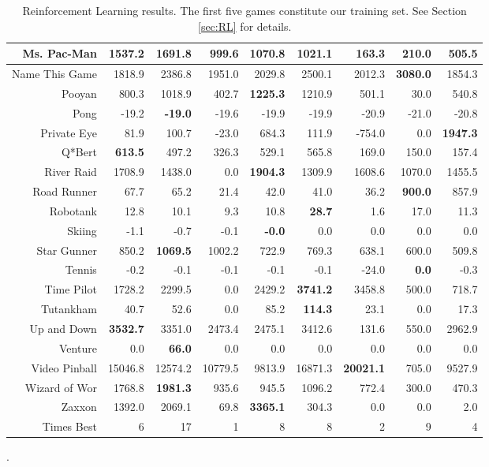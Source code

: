 \documentclass[twoside,11pt]{article}
\newcommand{\gamename}[1]{{\sc #1}}
\begin{document}
\begin{table}[h!]
\begin{center}
\begin{tabular}{|r|r|r|r|r|r||r|r|r|}
\hline
\gamename{Ms. Pac-Man} & 1537.2& \textbf { 1691.8 }& 999.6& 1070.8& 1021.1& 163.3& 210.0& 505.5\\
\hline
\gamename{Name This Game} & 1818.9& 2386.8& 1951.0& 2029.8& 2500.1& 2012.3& \textbf { 3080.0 }& 1854.3\\
\hline
\gamename{Pooyan} & 800.3& 1018.9& 402.7& \textbf { 1225.3 }& 1210.9& 501.1& 30.0& 540.8\\
\hline
\gamename{Pong} & -19.2& \textbf { -19.0 }& -19.6& -19.9& -19.9& -20.9& -21.0& -20.8\\
\hline
\gamename{Private Eye} & 81.9& 100.7& -23.0& 684.3& 111.9& -754.0& 0.0& \textbf { 1947.3 }\\
\hline
\gamename{Q*Bert} & \textbf { 613.5 }& 497.2& 326.3& 529.1& 565.8& 169.0& 150.0& 157.4\\
\hline
\gamename{River Raid} & 1708.9& 1438.0& 0.0& \textbf { 1904.3 }& 1309.9& 1608.6& 1070.0& 1455.5\\
\hline
\gamename{Road Runner} & 67.7& 65.2& 21.4& 42.0& 41.0& 36.2& \textbf { 900.0 }& 857.9\\
\hline
\gamename{Robotank} & 12.8& 10.1& 9.3& 10.8& \textbf { 28.7 }& 1.6& 17.0& 11.3\\
\hline
\gamename{Skiing} & -1.1& -0.7& -0.1& \textbf { -0.0 }& 0.0& 0.0& 0.0& 0.0\\
\hline
\gamename{Star Gunner} & 850.2& \textbf { 1069.5 }& 1002.2& 722.9& 769.3& 638.1& 600.0& 509.8\\
\hline
\gamename{Tennis} & -0.2& -0.1& -0.1& -0.1& -0.1& -24.0& \textbf { 0.0 }& -0.3\\
\hline
\gamename{Time Pilot} & 1728.2& 2299.5& 0.0& 2429.2& \textbf { 3741.2 }& 3458.8& 500.0& 718.7\\
\hline
\gamename{Tutankham} & 40.7& 52.6& 0.0& 85.2& \textbf { 114.3 }& 23.1& 0.0& 17.3\\
\hline
\gamename{Up and Down} & \textbf { 3532.7 }& 3351.0& 2473.4& 2475.1& 3412.6& 131.6& 550.0& 2962.9\\
\hline
\gamename{Venture} & 0.0& \textbf { 66.0 }& 0.0& 0.0& 0.0& 0.0& 0.0& 0.0\\
\hline
\gamename{Video Pinball} & 15046.8& 12574.2& 10779.5& 9813.9& 16871.3& \textbf { 20021.1 }& 705.0& 9527.9\\
\hline
\gamename{Wizard of Wor} & 1768.8& \textbf { 1981.3 }& 935.6& 945.5& 1096.2& 772.4& 300.0& 470.3\\
\hline
\gamename{Zaxxon} & 1392.0& 2069.1& 69.8& \textbf { 3365.1 }& 304.3& 0.0& 0.0& 2.0\\
\hline
\hline
Times Best & 6& 17& 1& 8& 8& 2& 9& 4\\
\hline
\end{tabular}
\clearpage{}
\caption{Reinforcement Learning results. The first five games constitute our training set. See Section \ref{sec:RL} for details.\label{table:appendix:detailed_results:rl}}.
\end{center}
\end{table}
\end{document}
